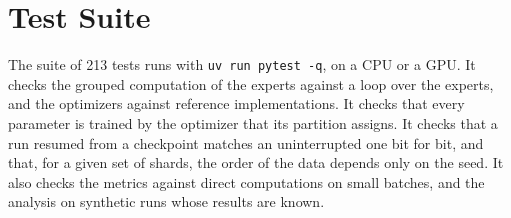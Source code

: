 \section{Test Suite}
\label{app:reproduction-tests}
The suite of 213 tests runs with \texttt{uv run pytest -q}, on a CPU or a GPU\@. It checks the grouped computation of the experts against a loop over the experts, and the optimizers against reference implementations. It checks that every parameter is trained by the optimizer that its partition assigns. It checks that a run resumed from a checkpoint matches an uninterrupted one bit for bit, and that, for a given set of shards, the order of the data depends only on the seed. It also checks the metrics against direct computations on small batches, and the analysis on synthetic runs whose results are known.
